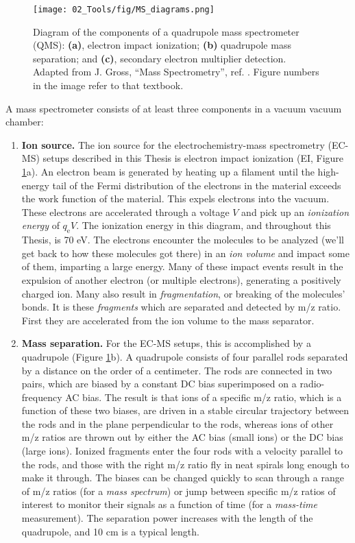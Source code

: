 \begin{figure}[t]
	\texttt{[image: 02\_Tools/fig/MS\_diagrams.png]}
	\caption{Diagram of the components of a quadrupole mass spectrometer (QMS): \textbf{(a)}, electron impact ionization; \textbf{(b)} quadrupole mass separation; and \textbf{(c)},  secondary electron multiplier detection. Adapted from J. Gross, ``Mass Spectrometry'', ref. . Figure numbers in the image refer to that textbook.}
	\label{fig:MS}
\end{figure}

A mass spectrometer consists of at least three components in a vacuum vacuum chamber\cite{Gross2007}: 

\begin{enumerate}
	\item \textbf{Ion source.} The ion source for the electrochemistry-mass spectrometry (EC-MS) setups described in this Thesis is electron impact ionization (EI, Figure \ref{fig:MS}a). An electron beam is generated by heating up a filament until the high-energy tail of the Fermi distribution of the electrons in the material exceeds the work function of the material. This expels electrons into the vacuum. These electrons are accelerated through a voltage $V$ and pick up an \textit{ionization energy} of $q_\text{e}V$. The ionization energy in this diagram, and throughout this Thesis, is 70 eV. The electrons encounter the molecules to be analyzed (we'll get back to how these molecules got there) in an \textit{ion volume} and impact some of them, imparting a large energy. Many of these impact events result in the expulsion of another electron (or multiple electrons), generating a positively charged ion. Many also result in \textit{fragmentation}, or breaking of the molecules' bonds. It is these \textit{fragments} which are separated and detected by m/z ratio. First they are accelerated from the ion volume to the mass separator.
	
	\item \textbf{Mass separation.} For the EC-MS setups, this is accomplished by a quadrupole (Figure \ref{fig:MS}b). A quadrupole consists of four parallel rods separated by a distance on the order of a centimeter. The rods are connected in two pairs, which are biased by a constant DC bias superimposed on a radio-frequency AC bias. The result is that ions of a specific m/z ratio, which is a function of these two biases, are driven in a stable circular trajectory between the rods and in the plane perpendicular to the rods, whereas ions of other m/z ratios are thrown out by either the AC bias (small ions) or the DC bias (large ions). Ionized fragments enter the four rods with a velocity parallel to the rods, and those with the right m/z ratio fly in neat spirals long enough to make it through. The biases can be changed quickly to scan through a range of m/z ratios (for a \textit{mass spectrum}) or jump between specific m/z ratios of interest to monitor their signals as a function of time (for a \textit{mass-time} measurement). The separation power increases with the length of the quadrupole, and 10 cm is a typical length. 
	

\end{enumerate}
